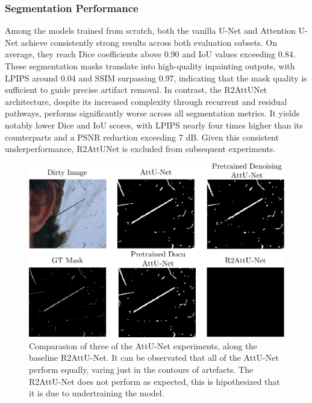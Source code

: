 \documentclass[10pt,a4paper,twocolumn,twoside]{article}
\begin{document}
\subsubsection{Segmentation Performance}
Among the models trained from scratch, both the vanilla U-Net and Attention U-Net achieve consistently strong results across both evaluation subsets. On average, they reach Dice coefficients above 0.90 and IoU values exceeding 0.84. These segmentation masks translate into high-quality inpainting outputs, with LPIPS around 0.04 and SSIM surpassing 0.97, indicating that the mask quality is sufficient to guide precise artifact removal. In contrast, the R2AttUNet architecture, despite its increased complexity through recurrent and residual pathways, performs significantly worse across all segmentation metrics. It yields notably lower Dice and IoU scores, with LPIPS nearly four times higher than its counterparts and a PSNR reduction exceeding 7 dB. Given this consistent underperformance, R2AttUNet is excluded from subsequent experiments. 
\begin{figure}[htbp]
    \centering
    \includegraphics[width=0.8\linewidth]{img/segmentation_figure.pdf}
    \caption{\small Comparasion of three of the AttU-Net experiments, along the baseline R2AttU-Net. It can be observated that all of the AttU-Net perform equally, varing just in the contours of artefacts. The R2AttU-Net does not perform as expected, this is hipothesized that it is due to undertraining the model.}
    \label{fig:segmentation_performance}
\end{figure}
\end{document}

